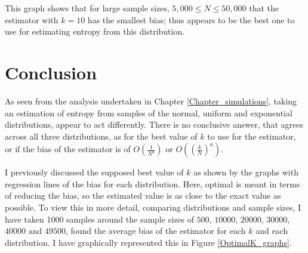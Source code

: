 \documentclass[12pt]{report}
\begin{document}
This graph shows that for large sample sizes, $5,000 \leq N \leq 50,000$ that the estimator with $k=10$ has the smallest bias; thus appears to be the best one to use for estimating entropy from this distribution.









\chapter{Conclusion} \label{chapter_conclusion}

As seen from the analysis undertaken in Chapter \ref{Chapter_simulations}, taking an estimation of entropy from samples of the normal, uniform and exponential distributions, appear to act differently. There is no conclusive answer, that agrees across all three distributions,  as for the best value of $k$ to use for the estimator, or if the bias of the estimator is of $O \left( \frac{1}{N^{a}} \right)$ or $O\left( \left( \frac{k}{N} \right)^{a} \right)$. 

I previously discussed the supposed best value of $k$ as shown by the graphs with regression lines of the bias for each distribution. Here, optimal is meant in terms of reducing the bias, so the estimated value is as close to the exact value as possible. To view this in more detail, comparing distributions and sample sizes, I have taken 1000 samples around the sample sizes of $500$, $10000$, $20000$, $30000$, $40000$ and $49500$, found the average bias of the estimator for each $k$ and each distribution. I have graphically represented this in Figure \ref{OptimalK_graphs}. 
\end{document}
